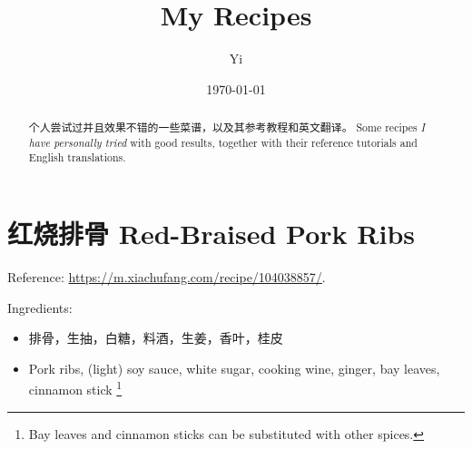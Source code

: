 \documentclass{article}
\newcommand{\chn}[1]{\foreignlanguage{chinese-simplified}{#1}}
\begin{document}
\title{My Recipes}
\author{Yi}
\date{\today}
\maketitle
\begin{abstract}
    \chn{\textsf{个人尝试过}并且效果不错的一些菜谱，以及其参考教程和英文翻译。}
    Some recipes \emph{I have personally tried} with good results, together with their reference tutorials and English translations.
\end{abstract}
\tableofcontents
\section{\foreignlanguage{chinese-simplified}{红烧排骨} Red-Braised Pork Ribs}
Reference: \url{https://m.xiachufang.com/recipe/104038857/}.

Ingredients: 
\begin{itemize}
    \item \chn{排骨，生抽，白糖，料酒，生姜，香叶，桂皮}
    \item Pork ribs, (light) soy sauce, white sugar, cooking wine, ginger, bay leaves, cinnamon stick \footnote{Bay leaves and cinnamon sticks can be substituted with other spices.}
\end{itemize}
\end{document}
